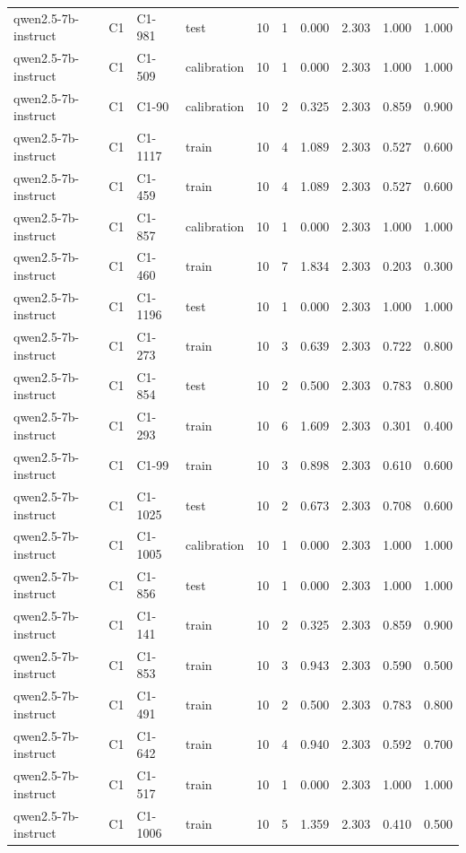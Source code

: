 \begin{table}
\begin{tabular}{llllrrrrrr}
qwen2.5-7b-instruct & C1 & C1-981 & test & 10 & 1 & 0.000 & 2.303 & 1.000 & 1.000 \\
qwen2.5-7b-instruct & C1 & C1-509 & calibration & 10 & 1 & 0.000 & 2.303 & 1.000 & 1.000 \\
qwen2.5-7b-instruct & C1 & C1-90 & calibration & 10 & 2 & 0.325 & 2.303 & 0.859 & 0.900 \\
qwen2.5-7b-instruct & C1 & C1-1117 & train & 10 & 4 & 1.089 & 2.303 & 0.527 & 0.600 \\
qwen2.5-7b-instruct & C1 & C1-459 & train & 10 & 4 & 1.089 & 2.303 & 0.527 & 0.600 \\
qwen2.5-7b-instruct & C1 & C1-857 & calibration & 10 & 1 & 0.000 & 2.303 & 1.000 & 1.000 \\
qwen2.5-7b-instruct & C1 & C1-460 & train & 10 & 7 & 1.834 & 2.303 & 0.203 & 0.300 \\
qwen2.5-7b-instruct & C1 & C1-1196 & test & 10 & 1 & 0.000 & 2.303 & 1.000 & 1.000 \\
qwen2.5-7b-instruct & C1 & C1-273 & train & 10 & 3 & 0.639 & 2.303 & 0.722 & 0.800 \\
qwen2.5-7b-instruct & C1 & C1-854 & test & 10 & 2 & 0.500 & 2.303 & 0.783 & 0.800 \\
qwen2.5-7b-instruct & C1 & C1-293 & train & 10 & 6 & 1.609 & 2.303 & 0.301 & 0.400 \\
qwen2.5-7b-instruct & C1 & C1-99 & train & 10 & 3 & 0.898 & 2.303 & 0.610 & 0.600 \\
qwen2.5-7b-instruct & C1 & C1-1025 & test & 10 & 2 & 0.673 & 2.303 & 0.708 & 0.600 \\
qwen2.5-7b-instruct & C1 & C1-1005 & calibration & 10 & 1 & 0.000 & 2.303 & 1.000 & 1.000 \\
qwen2.5-7b-instruct & C1 & C1-856 & test & 10 & 1 & 0.000 & 2.303 & 1.000 & 1.000 \\
qwen2.5-7b-instruct & C1 & C1-141 & train & 10 & 2 & 0.325 & 2.303 & 0.859 & 0.900 \\
qwen2.5-7b-instruct & C1 & C1-853 & train & 10 & 3 & 0.943 & 2.303 & 0.590 & 0.500 \\
qwen2.5-7b-instruct & C1 & C1-491 & train & 10 & 2 & 0.500 & 2.303 & 0.783 & 0.800 \\
qwen2.5-7b-instruct & C1 & C1-642 & train & 10 & 4 & 0.940 & 2.303 & 0.592 & 0.700 \\
qwen2.5-7b-instruct & C1 & C1-517 & train & 10 & 1 & 0.000 & 2.303 & 1.000 & 1.000 \\
qwen2.5-7b-instruct & C1 & C1-1006 & train & 10 & 5 & 1.359 & 2.303 & 0.410 & 0.500 \\

\end{tabular}
\end{table}
